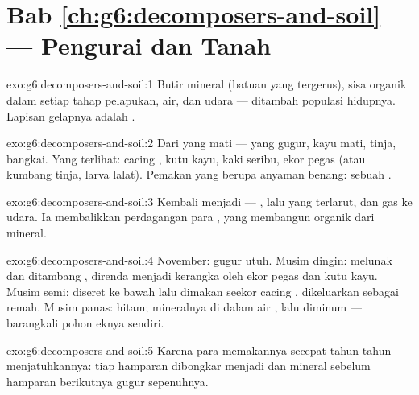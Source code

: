 \section*{Bab \ref{ch:g6:decomposers-and-soil} --- Pengurai dan Tanah}

\begin{solution}{exo:g6:decomposers-and-soil:1}
Butir mineral (batuan yang tergerus), sisa organik dalam setiap tahap
pelapukan, air, dan udara --- ditambah populasi hidupnya. Lapisan
gelapnya adalah .
\end{solution}

\begin{solution}{exo:g6:decomposers-and-soil:2}
Dari  yang mati ---  yang gugur, kayu mati, tinja,
bangkai. Yang terlihat: cacing , kutu kayu, kaki seribu, ekor
pegas (atau kumbang tinja, larva lalat). Pemakan yang berupa anyaman
benang: sebuah .
\end{solution}

\begin{solution}{exo:g6:decomposers-and-soil:3}
Kembali menjadi  --- , lalu  yang
terlarut, dan gas ke udara. Ia membalikkan perdagangan para ,
yang membangun organik dari mineral.
\end{solution}

\begin{solution}{exo:g6:decomposers-and-soil:4}
November: gugur utuh. Musim dingin: melunak dan ditambang ,
direnda menjadi kerangka oleh ekor pegas dan kutu kayu. Musim semi:
diseret ke bawah lalu dimakan seekor cacing , dikeluarkan sebagai
remah. Musim panas:  hitam; mineralnya di dalam air , lalu
diminum  --- barangkali  pohon eknya sendiri.
\end{solution}

\begin{solution}{exo:g6:decomposers-and-soil:5}
Karena para  memakannya secepat tahun-tahun menjatuhkannya:
tiap hamparan dibongkar menjadi  dan mineral sebelum hamparan
berikutnya gugur sepenuhnya.
\end{solution}

